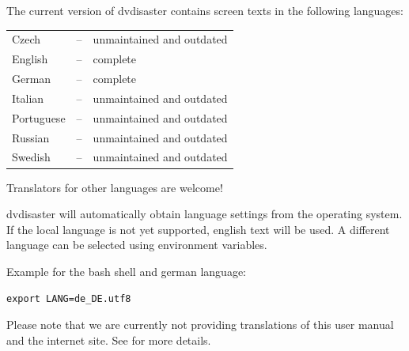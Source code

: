 {The current version of dvdisaster contains screen texts in the following languages:

\medskip
  
\begin{tabular}{lll}
Czech &--& unmaintained and outdated\\
English &--& complete\\
German &--& complete\\
Italian &--& unmaintained and outdated\\
Portuguese &--& unmaintained and outdated\\
Russian &--& unmaintained and outdated\\
Swedish &--& unmaintained and outdated\\
\end{tabular}

\medskip
  
Translators for other languages are welcome!

\bigskip

dvdisaster will automatically obtain language settings from the operating system.
If the local language is not yet supported, english text will be used. A different
language can be selected using environment variables.

\medskip

Example for the bash shell and german language:

\smallskip

{\tt export LANG=de\_DE.utf8}

\medskip

Please note that we are currently not providing translations of this user manual
and the internet site. See  for more details. 
}


